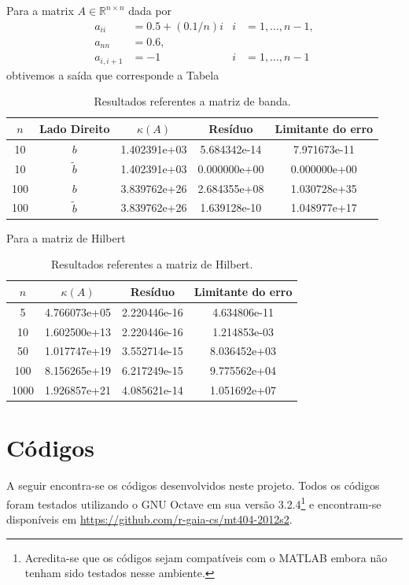 \documentclass[12pt,a4paper]{article}
\begin{document}
Para a matrix $A \in \mathbb{R}^{n \times n}$ dada por
\begin{align*}
    a_{ii} &= 0.5 + (0.1 / n) i & i &= 1, \ldots, n - 1, \\
    a_{nn} &= 0.6, \\
    a_{i,i+1} &= -1 & i &= 1, \ldots, n - 1
\end{align*}
obtivemos a sa\'{i}da que corresponde a Tabela~

\begin{table}[!htb]
    \centering
    \caption{Resultados referentes a matriz de banda.}
    \label{tab:res_matriz_banda}
    \begin{tabular}{|c|c|c|c|c|}
        \hline
        $n$ & Lado Direito & $\kappa(A)$ & Res\'{i}duo & Limitante do erro \\ \hline
        10 & $b$ & 1.402391e+03 & 5.684342e-14 & 7.971673e-11 \\ \hline
        10 & $\tilde{b}$ & 1.402391e+03 & 0.000000e+00 & 0.000000e+00 \\
        \hline
        100 & $b$ & 3.839762e+26 & 2.684355e+08 & 1.030728e+35 \\ \hline
        100 & $\tilde{b}$ & 3.839762e+26 & 1.639128e-10 & 1.048977e+17
        \\ \hline
    \end{tabular}
\end{table}


Para a matriz de Hilbert

\begin{table}[!htb]
    \centering
    \caption{Resultados referentes a matriz de Hilbert.}
    \label{tab:res_matriz_banda}
    \begin{tabular}{|c|c|c|c|}
        \hline
        $n$ & $\kappa(A)$ & Res\'{i}duo & Limitante do erro \\ \hline
        5 & 4.766073e+05 & 2.220446e-16 & 4.634806e-11 \\ \hline
        10 & 1.602500e+13 & 2.220446e-16 & 1.214853e-03 \\ \hline
        50 & 1.017747e+19 & 3.552714e-15 & 8.036452e+03 \\ \hline
        100 & 8.156265e+19 & 6.217249e-15 & 9.775562e+04 \\ \hline
        1000 & 1.926857e+21 & 4.085621e-14 & 1.051692e+07 \\ \hline
    \end{tabular}
\end{table}

\section{C\'{o}digos}
A seguir encontra-se os códigos desenvolvidos neste projeto. Todos os códigos
foram testados utilizando o GNU Octave em sua versão 3.2.4\footnote{Acredita-se
que os códigos sejam compatíveis com o MATLAB embora não tenham sido testados
nesse ambiente.} e encontram-se disponíveis em
\url{https://github.com/r-gaia-cs/mt404-2012s2}.


\end{document}
